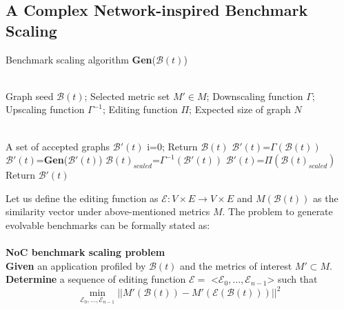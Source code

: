 \subsection{A Complex Network-inspired Benchmark Scaling}
\begin{algorithm}[tb]         %
\caption{Benchmark scaling algorithm  \textbf{Gen}($\mathcal B(t)$)}             %
\label{alg:main}                  %
\begin{algorithmic}[1]                %
\REQUIRE ~~\\

    Graph seed $\mathcal B(t)$; Selected metric set $M'\in M$; 
    Downscaling function $\Gamma$; Upscaling function $\Gamma^{-1}$; Editing function $\Pi$; Expected size of graph $N$                

\ENSURE ~~\\                           %
    A set of accepted graphs  \textbf{$\mathcal B'(t)$}
\STATE i=0;
\STATE Return $\mathcal B(t)$
\ELSE
\STATE $\mathcal B'(t)$=$\Gamma(\mathcal B(t))$
\STATE $\mathcal B'(t)$=\textbf{Gen}($\mathcal B'(t)$)
\STATE $\mathcal B(t)_{scaled}$=$\Gamma^{-1}(\mathcal B'(t))$
\STATE $\mathcal B'(t)$=$\Pi(\mathcal B(t)_{scaled})$
\ENDWHILE
\STATE Return $\mathcal B'(t)$
\ENDIF
\end{algorithmic}
\end{algorithm}
Let us define the editing function as $\mathcal E: V\times E \rightarrow V\times  E$ and $M(\mathcal B(t))$ as the similarity vector under above-mentioned metrics $M$. The problem to generate evolvable benchmarks can be formally stated as:\\\\
\noindent\textbf{NoC benchmark scaling problem} \\
 \textbf{Given} an application profiled by $\mathcal B(t)$ and the metrics of interest $M'\subset M$.\\
 \textbf{Determine} a sequence of editing function $\mathcal E=$ <$\mathcal E_0,...,\mathcal E_{n-1}$> such that
\begin{equation}\label{eq:prb_evl}
 \min\limits_{\mathcal E_0,...,\mathcal E_{n-1}} ||M'(\mathcal B(t))-M'(\mathcal E(\mathcal B(t)))||^2
\end{equation}
